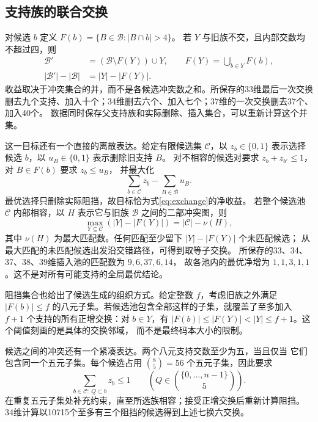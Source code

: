 \subsection{支持族的联合交换}

对候选 $b$ 定义 $F(b)=\{B\in\mathcal B:|B\cap b|>4\}$。
若 $Y$ 与旧族不交，且内部交数均不超过四，则
\begin{equation}
\begin{split}
\mathcal B'&=(\mathcal B\setminus F(Y))\cup Y,\qquad
 F(Y)=\bigcup_{b\in Y}F(b),\\
|\mathcal B'|-|\mathcal B|&=|Y|-|F(Y)|.
\end{split}
\label{eq:exchange}
\end{equation}
收益取决于冲突集合的并，而不是各候选冲突数之和。所保存的33维最后一次交换
删去九个支持、加入十个；34维删去六个、加入七个；37维的一次交换删去37个、加入40个。
数据同时保存父支持族和实际删除、插入集合，可以重新计算这个并集。

这一目标还有一个直接的离散表达。给定有限候选集 $\mathcal C$，以
$z_b\in\{0,1\}$ 表示选择候选 $b$，以 $u_B\in\{0,1\}$ 表示删除旧支持 $B$。
对不相容的候选对要求 $z_b+z_{b'}\le1$，对 $B\in F(b)$ 要求 $z_b\le u_B$，
并最大化
\[
\sum_{b\in\mathcal C}z_b-\sum_{B\in\mathcal B}u_B.
\]
最优选择只删除实际阻挡，故目标恰为式\eqref{eq:exchange}的净收益。
若整个候选池 $\mathcal C$ 内部相容，以 $H$ 表示它与旧族 $\mathcal B$
之间的二部冲突图，则
\[
\max_{Y\subseteq\mathcal C}(|Y|-|F(Y)|)=|\mathcal C|-\nu(H),
\]
其中 $\nu(H)$ 为最大匹配数。任何匹配至少留下 $|Y|-|F(Y)|$ 个未匹配候选；
从最大匹配的未匹配候选出发沿交错路径，可得到取等子交换。
所保存的33、34、37、38、39维插入池的匹配数为 $9,6,37,6,14$，
故各池内的最优净增为 $1,1,3,1,1$。这不是对所有可能支持的全局最优结论。

阻挡集合也给出了候选生成的组织方式。给定整数 $f$，考虑旧族之外满足
$|F(b)|\le f$ 的八元子集。若候选池包含全部这样的子集，就覆盖了至多加入
$f+1$ 个支持的所有正增交换：对 $b\in Y$，有
$|F(b)|\le|F(Y)|<|Y|\le f+1$。这个阈值刻画的是具体的交换邻域，
而不是最终码本大小的限制。

候选之间的冲突还有一个紧凑表达。两个八元支持交数至少为五，当且仅当
它们包含同一个五元子集。每个候选占用 $\binom85=56$ 个五元子集，因此要求
\[
\sum_{b\in\mathcal C:\ Q\subset b}z_b\le1
\qquad\left(Q\in\binom{\{0,\ldots,n-1\}}5\right).
\]
在重复五元子集处补充约束，直至所选族相容；接受正增交换后重新计算阻挡。
34维计算以10715个至多有三个阻挡的候选得到上述七换六交换。

